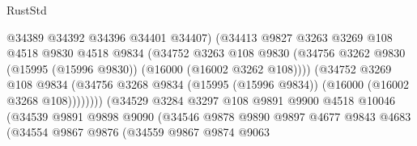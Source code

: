 \begin{lexlean}{RustStd}
\begin{coremodule}
                                      @34389
                                      @34392
                                      @34396
                                      @34401
                                      @34407)
                                    (@34413
                                      @9827
                                      @3263
                                      @3269
                                      @108
                                      @4518
                                      @9830
                                      @4518
                                      @9834
                                      (@34752
                                        @3263
                                        @108
                                        @9830
                                        (@34756
                                          @3262
                                          @9830
                                          (@15995 (@15996 @9830))
                                          (@16000 (@16002 @3262 @108))))
                                      (@34752
                                        @3269
                                        @108
                                        @9834
                                        (@34756
                                          @3268
                                          @9834
                                          (@15995 (@15996 @9834))
                                          (@16000 (@16002 @3268 @108))))))))
                              (@34529
                                @3284
                                @3297
                                @108
                                @9891
                                @9900
                                @4518
                                @10046
                                (@34539
                                  @9891
                                  @9898
                                  @9090
                                  (@34546
                                    @9878
                                    @9890
                                    @9897
                                    @4677
                                    @9843
                                    @4683
                                    (@34554
                                      @9867
                                      @9876
                                      (@34559
                                        @9867
                                        @9874
                                        @9063

\end{coremodule}
\end{lexlean}

